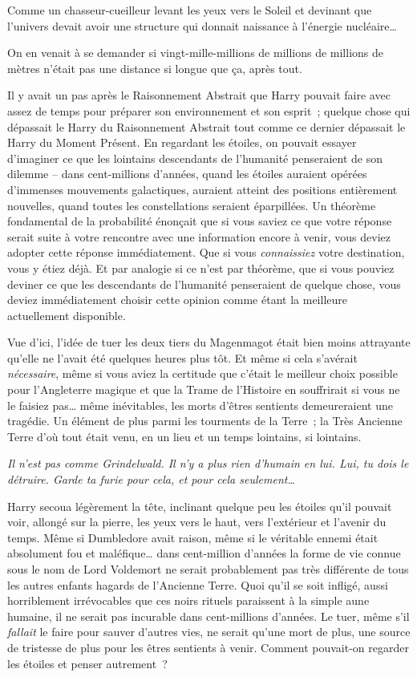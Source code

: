 Comme un chasseur-cueilleur levant les yeux vers le Soleil et devinant que l'univers devait avoir une structure qui donnait naissance à l'énergie nucléaire…

On en venait à se demander si vingt-mille-millions de millions de millions de mètres n'était pas une distance si longue que ça, après tout.

Il y avait un pas après le Raisonnement Abstrait que Harry pouvait faire avec assez de temps pour préparer son environnement et son esprit~; quelque chose qui dépassait le Harry du Raisonnement Abstrait tout comme ce dernier dépassait le Harry du Moment Présent. En regardant les étoiles, on pouvait essayer d'imaginer ce que les lointains descendants de l'humanité penseraient de son dilemme -- dans cent-millions d'années, quand les étoiles auraient opérées d'immenses mouvements galactiques, auraient atteint des positions entièrement nouvelles, quand toutes les constellations seraient éparpillées. Un théorème fondamental de la probabilité énonçait que si vous saviez ce que votre réponse serait suite à votre rencontre avec une information encore à venir, vous deviez adopter cette réponse immédiatement. Que si vous \emph{connaissiez} votre destination, vous y étiez déjà. Et par analogie si ce n'est par théorème, que si vous pouviez deviner ce que les descendants de l'humanité penseraient de quelque chose, vous deviez immédiatement choisir cette opinion comme étant la meilleure actuellement disponible.

Vue d'ici, l'idée de tuer les deux tiers du Magenmagot était bien moins attrayante qu'elle ne l'avait été quelques heures plus tôt. Et même si cela s'avérait \emph{nécessaire}, même si vous aviez la certitude que c'était le meilleur choix possible pour l'Angleterre magique et que la Trame de l'Histoire en souffrirait si vous ne le faisiez pas… même inévitables, les morts d'êtres sentients demeureraient une tragédie. Un élément de plus parmi les tourments de la Terre~; la Très Ancienne Terre d'où tout était venu, en un lieu et un temps lointains, si lointains.

\emph{Il n'est pas comme Grindelwald. Il n'y a plus rien d'humain en lui. Lui, tu dois le détruire. Garde ta furie pour cela, et pour cela seulement…}

Harry secoua légèrement la tête, inclinant quelque peu les étoiles qu'il pouvait voir, allongé sur la pierre, les yeux vers le haut, vers l'extérieur et l'avenir du temps. Même si Dumbledore avait raison, même si le véritable ennemi était absolument fou et maléfique… dans cent-million d'années la forme de vie connue sous le nom de Lord Voldemort ne serait probablement pas très différente de tous les autres enfants hagards de l'Ancienne Terre. Quoi qu'il se soit infligé, aussi horriblement irrévocables que ces noirs rituels paraissent à la simple aune humaine, il ne serait pas incurable dans cent-millions d'années. Le tuer, même s'il \emph{fallait} le faire pour sauver d'autres vies, ne serait qu'une mort de plus, une source de tristesse de plus pour les êtres sentients à venir. Comment pouvait-on regarder les étoiles et penser autrement~?

